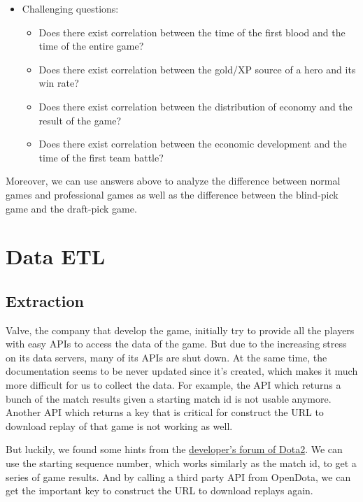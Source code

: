 \documentclass{article}
\begin{document}
\begin{itemize}
\begin{itemize}
    \end{itemize}
    \item Challenging questions:
    \begin{itemize}
        \item Does there exist correlation between the time of the first blood and the time of the entire game?
        \item Does there exist correlation between the gold/XP source of a hero and its win rate?
        \item Does there exist correlation between the distribution of economy and the result of the game?
        \item Does there exist correlation between the economic development and the time of the first team battle?
    \end{itemize}
\end{itemize}

Moreover, we can use answers above to analyze the difference between normal games and professional games as well as the difference between the blind-pick game and the draft-pick game.


\section{Data ETL}

\subsection{Extraction}

Valve, the company that develop the game, initially try to provide all the players with easy APIs to access the data of the game.
But due to the increasing stress on its data servers, many of its APIs are shut down.
At the same time, the documentation seems to be never updated since it's created, which makes it much more difficult for us to collect the data.
For example, the API which returns a bunch of the match results given a starting match id is not usable anymore.
Another API which returns a key that is critical for construct the URL to download replay of that game is not working as well.

But luckily, we found some hints from the \href{https://dev.dota2.com}{developer's forum of Dota2}.
We can use the starting sequence number, which works similarly as the match id, to get a series of game results.
And by calling a third party API from OpenDota, we can get the important key to construct the URL to download replays again.
\end{document}
